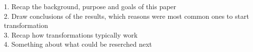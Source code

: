1. Recap the background, purpose and goals of this paper \\
2. Draw conclusions of the results, which reasons were most common ones to start
   transformation \\
3. Recap how transformations typically work \\
4. Something about what could be reserched next \\
